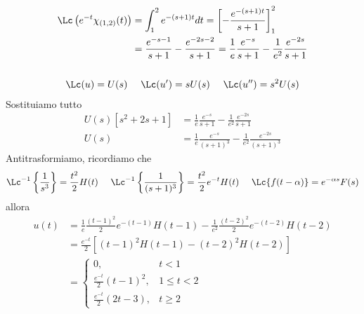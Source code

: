 \begin{gather*}
\begin{aligned}
\Lc\left(e^{- t} \chi_{(1, 2)}(t)\right) & = \int^{2}_{1} e^{- (s + 1) t} dt = \left[ - \frac{e^{- (s + 1) t}}{s + 1}\right]^{2}_{1}\\
 & = \frac{e^{- s - 1}}{s + 1} - \frac{e^{- 2s - 2}}{s + 1} = \frac{1}{e}\frac{e^{- s}}{s + 1} - \frac{1}{e^{2}}\frac{e^{- 2s}}{s + 1}
\end{aligned}\\
\\
\Lc(u) = U(s) \ \ \ \ \Lc(u') = sU(s) \ \ \ \ \Lc(u'') = s^{2} U(s)
\end{gather*}
Sostituiamo tutto
\begin{equation*}
\begin{aligned}
U(s)\left[ s^{2} + 2s + 1\right] & = \frac{1}{e}\frac{e^{- s}}{s + 1} - \frac{1}{e^{2}}\frac{e^{- 2s}}{s + 1}\\
U(s) & = \frac{1}{e}\frac{e^{- s}}{(s + 1)^{3}} - \frac{1}{e^{2}}\frac{e^{- 2s}}{(s + 1)^{3}}
\end{aligned}
\end{equation*}
Antitrasformiamo, ricordiamo che
\begin{equation*}
\Lc^{- 1}\left\{\frac{1}{s^{3}}\right\} = \frac{t^{2}}{2} H(t) \ \ \ \ \Lc^{- 1}\left\{\frac{1}{(s + 1)^{3}}\right\} = \frac{t^{2}}{2} e^{- t} H(t) \ \ \ \ \Lc\{f(t - \alpha)\} = e^{- \alpha s} F(s)
\end{equation*}
allora
\begin{align*}
u(t) & = \frac{1}{e}\frac{(t - 1)^{2}}{2} e^{- (t - 1)} H(t - 1) - \frac{1}{e^{2}}\frac{(t - 2)^{2}}{2} e^{- (t - 2)} H(t - 2)\\
 & = \frac{e^{- t}}{2}\left[(t - 1)^{2} H(t - 1) - (t - 2)^{2} H(t - 2)\right]\\
 & =
\begin{cases}
0, & t < 1\\
\frac{e^{- t}}{2}(t - 1)^{2}, & 1 \leq t < 2\\
\frac{e^{- t}}{2}(2t - 3), & t \geq 2
\end{cases}
\end{align*}

\Soluzione


